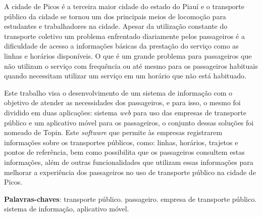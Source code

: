 \begin{resumo}
A cidade de Picos é a terceira maior cidade do estado do Piauí e o transporte público da cidade se tornou um dos principais meios de locomoção para estudantes e trabalhadores na cidade. Apesar da utilização constante do transporte coletivo um problema enfrentado diariamente pelos passageiros é a dificuldade de acesso a informações básicas da prestação do serviço como as linhas e horários disponíveis. O que é um grande problema para passageiros que não utilizam o serviço com frequência ou até mesmo para os passageiros habituais quando necessitam utilizar um serviço em um horário que não está habituado.

Este trabalho visa o desenvolvimento de um sistema de informação com o objetivo de atender as necessidades dos passageiros, e para isso, o mesmo foi dividido em duas aplicações: sistema \textit{web} para uso das empresas de transporte público e um aplicativo móvel para os passageiros, o conjunto dessas soluções foi nomeado de Topin. Este \textit{software} que permite às empresas registrarem informações sobre os transportes públicos, como: linhas, horários, trajetos e pontos de referência, bem como possibilita que os passageiros consultem estas informações, além de outras funcionalidades que utilizam essas informações para melhorar a experiência dos passageiros no uso de transporte público na cidade de Picos.

\vspace{\onelineskip}
\noindent
\textbf{Palavras-chaves}: transporte público. passageiro. empresa de transporte público. sistema de informação, aplicativo móvel.
\end{resumo}


